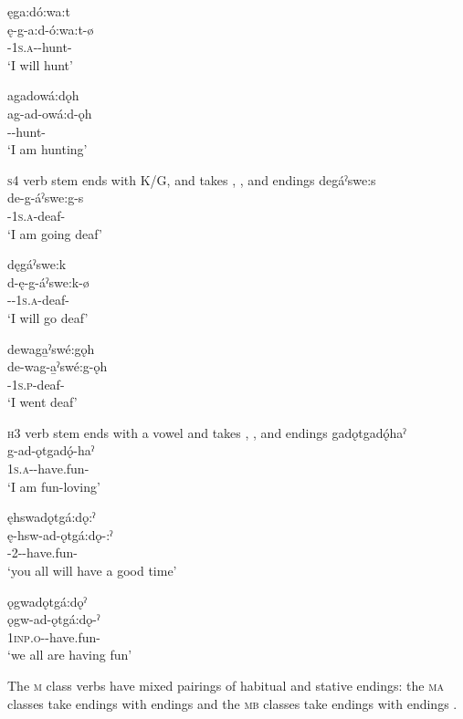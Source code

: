 \ex ęga:dó:wa:t\\
\gll ę-g-a:d-ó:wa:t-ø\\
 \fut-\textsc{1s.a}-{\semireflexive}-hunt-{\zeropunctual}\\
\glt `I will hunt'

\ex agadowá:dǫh\\
\gll ag-ad-owá:d-ǫh\\
 -{\semireflexive}-hunt-{\stative}\\
\glt `I am hunting'
\z
\z

\ea\label{ex:aspclass2} \textsc{s4} verb stem ends with K/G, and takes  {\habitual},  {\zeropunctual}, and  {\stative} endings
\ea degáˀswe:s\\
\gll de-g-áˀswe:g-s\\
 {\dualic}-\textsc{1s.a}-deaf-{\habitual}\\
\glt `I am going deaf'

\ex dęgáˀswe:k\\
\gll d-ę-g-áˀswe:k-ø\\
 {\dualic}-{\future}-\textsc{1s.a}-deaf-{\zeropunctual}\\
\glt `I will go deaf'

\ex dewaga̱ˀswé:gǫh\\
\gll de-wag-a̱ˀswé:g-ǫh\\
 {\dualic}-\textsc{1s.p}-deaf-{\stative}\\
\glt `I went deaf'
\z
\z


\ea\label{ex:aspclass3} \textsc{h3} verb stem ends with a vowel and takes  {\habitual},  {\punctual}, and  {\stative} endings
\ea gadǫtgadǫ́haˀ\\
\gll g-ad-ǫtgadǫ́-haˀ\\
 \textsc{1s.a}-{\semireflexive}-have.fun-{\habitual}\\
\glt `I am fun-loving'

\ex ęhswadǫtgá:dǫ:ˀ\\
\gll ę-hsw-ad-ǫtgá:dǫ-:ˀ\\
 \fut-{2\pla}-{\semireflexive}-have.fun-{\punctual}\\
\glt `you all will have a good time'

\ex ǫgwadǫtgá:dǫˀ\\
\gll ǫgw-ad-ǫtgá:dǫ-ˀ\\
 \textsc{1inp.o}-{\semireflexive}-have.fun-{\stative}\\
\glt `we all are having fun'
\z
\z

The \textsc{m} class verbs have mixed pairings of habitual and stative endings: the \textsc{ma} classes take  {\habitual} endings with  {\stative} endings  and the \textsc{mb} classes take  {\habitual} endings with  {\stative} endings .

